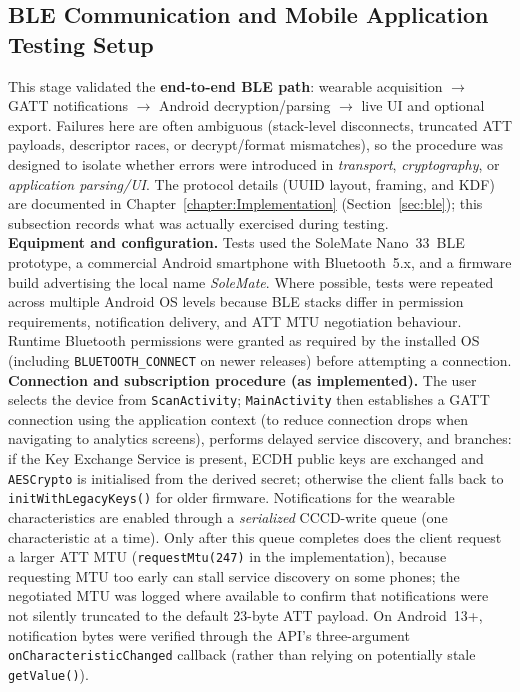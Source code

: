 \subsection{BLE Communication and Mobile Application Testing Setup}
\label{subsec:ble_mobile_testing_setup}

\noindent This stage validated the \textbf{end-to-end BLE path}: wearable acquisition $\rightarrow$
GATT notifications $\rightarrow$ Android decryption/parsing $\rightarrow$ live UI and optional
export. Failures here are often ambiguous (stack-level disconnects, truncated ATT payloads,
descriptor races, or decrypt/format mismatches), so the procedure was designed to isolate whether
errors were introduced in \emph{transport}, \emph{cryptography}, or \emph{application parsing/UI}.
The protocol details (UUID layout, framing, and KDF) are documented in
Chapter~\ref{chapter:Implementation} (Section~\ref{sec:ble}); this subsection records what was
actually exercised during testing. \\

\noindent \textbf{Equipment and configuration.} Tests used the SoleMate Nano~33~BLE prototype, a
commercial Android smartphone with Bluetooth~5.x, and a firmware build advertising the local name
\textit{SoleMate}. Where possible, tests were repeated across multiple Android OS levels because
BLE stacks differ in permission requirements, notification delivery, and ATT MTU negotiation
behaviour. Runtime Bluetooth permissions were granted as required by the installed OS (including
\texttt{BLUETOOTH\_CONNECT} on newer releases) before attempting a connection. \\

\noindent \textbf{Connection and subscription procedure (as implemented).} The user selects the
device from \texttt{ScanActivity}; \texttt{MainActivity} then establishes a GATT connection using
the application context (to reduce connection drops when navigating to analytics screens),
performs delayed service discovery, and branches: if the Key Exchange Service is present, ECDH
public keys are exchanged and \texttt{AESCrypto} is initialised from the derived secret; otherwise
the client falls back to \texttt{initWithLegacyKeys()} for older firmware. Notifications for the
wearable characteristics are enabled through a \emph{serialized} CCCD-write queue (one characteristic
at a time). Only after this queue completes does the client request a larger ATT MTU
(\texttt{requestMtu(247)} in the implementation), because requesting MTU too early can stall
service discovery on some phones; the negotiated MTU was logged where available to confirm that
notifications were not silently truncated to the default 23-byte ATT payload. On Android~13+,
notification bytes were verified through the API's three-argument
\texttt{onCharacteristicChanged} callback (rather than relying on potentially stale
\texttt{getValue()}). \\

